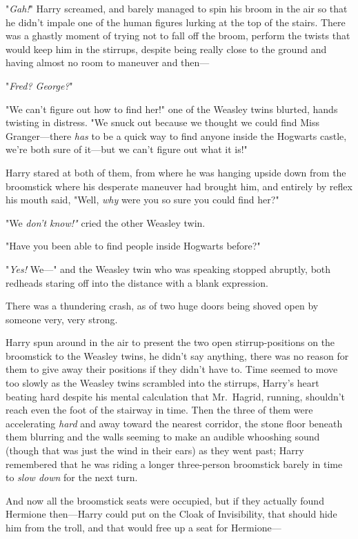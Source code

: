 "\emph{Gah!}" Harry screamed, and barely managed to spin his broom in the air so that he didn't impale one of the human figures lurking at the top of the stairs. There was a ghastly moment of trying not to fall off the broom, perform the twists that would keep him in the stirrups, despite being really close to the ground and having almost no room to maneuver and then---

"\emph{Fred? George?}"

"We can't figure out how to find her!" one of the Weasley twins blurted, hands twisting in distress. "We snuck out because we thought we could find Miss Granger---there \emph{has} to be a quick way to find anyone inside the Hogwarts castle, we're both sure of it---but we can't figure out what it is!"

Harry stared at both of them, from where he was hanging upside down from the broomstick where his desperate maneuver had brought him, and entirely by reflex his mouth said, "Well, \emph{why} were you so sure you could find her?"

"We \emph{don't know!"} cried the other Weasley twin.

"Have you been able to find people inside Hogwarts before?"

"\emph{Yes!} We---" and the Weasley twin who was speaking stopped abruptly, both redheads staring off into the distance with a blank expression.

There was a thundering crash, as of two huge doors being shoved open by someone very, very strong.

Harry spun around in the air to present the two open stirrup-positions on the broomstick to the Weasley twins, he didn't say anything, there was no reason for them to give away their positions if they didn't have to. Time seemed to move too slowly as the Weasley twins scrambled into the stirrups, Harry's heart beating hard despite his mental calculation that Mr.~Hagrid, running, shouldn't reach even the foot of the stairway in time. Then the three of them were accelerating \emph{hard} and away toward the nearest corridor, the stone floor beneath them blurring and the walls seeming to make an audible whooshing sound (though that was just the wind in their ears) as they went past; Harry remembered that he was riding a longer three-person broomstick barely in time to \emph{slow down} for the next turn.

And now all the broomstick seats were occupied, but if they actually found Hermione then---Harry could put on the Cloak of Invisibility, that should hide him from the troll, and that would free up a seat for Hermione---

